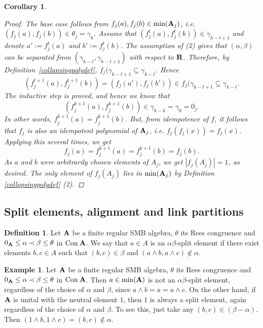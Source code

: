 \documentclass[11pt]{amsart}
\newcommand{\m}[1]{{\uppercase {\mathbf {#1}}}}
\newcommand{\con}{{\rm Con\:}}
\newcommand{\cn}[1]{{\con\m {#1}}}
\newcommand{\mt}{\wedge}
\newtheorem{cor}[thm]{Corollary}
\theoremstyle{definition}
\newtheorem{exmpl}[thm]{Example}
\newtheorem{df}[thm]{Definition}
\begin{document}
\begin{cor}
\begin{proof}
The base case follows from $f_j(a),f_j(b)\in\mathrm{min}(\m a_j)$, i.e. $(f_j(a),f_j(b))\in\theta_j=\gamma_k$. Assume that $(f_j^{t}(a),f_j^{t}(b))\in\gamma_{k-t+1}$ and denote $a':=f_j^{t}(a)$ and $b':=f_j^{t}(b)$. The assumption of (2) gives that $(\alpha,\beta)$ can be separated from $(\gamma_{k-t},\gamma_{k-t+1})$ with respect to $\m r$. Therefore, by Definition~\ref{collapsingpolydef}, $f_j(\gamma_{k-t+1}\subseteq\gamma_{k-t}$. Hence 
\[(f_j^{t+1}(a),f_j^{t+1}(b))=(f_j(a'),f_j(b'))\in f_j(\gamma_{k-t+1}\subseteq\gamma_{k-t}.\]
The inductive step is proved, and hence we know that $$(f_j^{k+1}(a),f_j^{k+1}(b))\in \gamma_{k-k}=\gamma_0=0_j.$$
In other words, $f_j^{k+1}(a)=f_j^{k+1}(b)$. But, from idempotence of $f$, it follows that $f_j$ is also an idempotent polynomial of $\m a_j$, i.e. $f_j(f_j(x))=f_j(x)$. Applying this several times, we get
\[f_j(a)=f_j^{k+1}(a)=f_j^{k+1}(b)=f_j(b).\]
As $a$ and $b$ were arbitrarily chosen elements of $A_j$, we get $|f_j(A_j)|=1$, as desired. The only element of $f_j(A_j)$ lies in $\mathrm{min}(\m a_j)$ by Definition \ref{collapsingpolydef} (2).
\end{proof}

\end{cor}

\subsection{Split elements, alignment and link partitions}

\begin{df}\label{splitdf}
Let $\m a$ be a finite regular SMB algebra, $\theta$ its Rees congruence and $0_{\m a}\leq \alpha\prec\beta\leq\theta$ in $\cn a$. We say that $a\in A$ is an $\alpha\beta$-split element if there exist elements $b,c\in A$ such that $(b,c)\in\beta$ and $(a\mt b,a\mt c)\notin\alpha$.
\end{df}

\begin{exmpl}\label{topsplitbotnot}
Let $\m a$ be a finite regular SMB algebra, $\theta$ its Rees congruence and $0_{\m a}\leq \alpha\prec\beta\leq\theta$ in $\cn a$. Then $a\in\mathrm{min}(\m a)$ is not an $\alpha\beta$-split element, regardless of the choice of $\alpha$ and $\beta$, since $a\mt b=a=a\mt c$. On the other hand, if $\m a$ is unital with the neutral element $1$, then $1$ is always a split element, again regardless of the choice of $\alpha$ and $\beta$. To see this, just take any $(b,c)\in(\beta-\alpha)$. Then $(1\mt b,1\mt c)=(b,c)\notin\alpha$.  
\end{exmpl}
\end{document}
